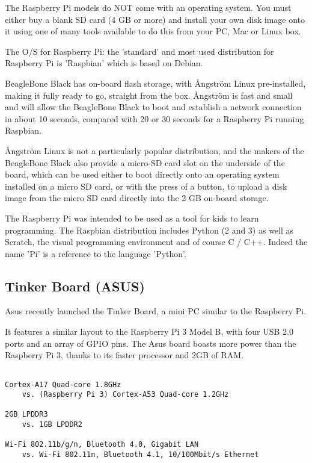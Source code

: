 The Raspberry Pi models do NOT come with an operating system. You must either
buy a blank SD card (4 GB or more) and install your own disk image onto it using
one of many tools available to do this from your PC, Mac or Linux box.

The O/S for Raspberry Pi: the 'standard' and most used distribution for
Raspberry Pi is 'Raspbian' which is based on Debian.

\begin{mdframed}

BeagleBone Black has on-board flash storage, with  Ångström Linux pre-installed,
making it fully ready to go, straight from the box.
Ångström is fast and small and will allow the BeagleBone Black to boot and
establish a network connection in about 10 seconds, compared with 20 or 30
seconds for a Raspberry Pi running Raspbian.


Ångström Linux is not a particularly popular distribution, and the makers of the
BeagleBone Black also provide a micro-SD card slot on the underside of the
board, which can be used either to boot directly onto an operating system
installed on a micro SD card, or with the press of a button, to upload a disk
image from the micro SD card directly into the 2 GB on-board storage.
\end{mdframed}


The Raspberry Pi was intended to be used as a tool for kids to learn
programming. The Raspbian distribution includes Python (2 and 3) as well as
Scratch, the visual programming environment and of course C / C++. Indeed the name 'Pi' is a reference to the language 'Python'. 


\subsection{Tinker Board (ASUS)}
\label{sec:TinkerBoard-Asus}

Asus recently launched the Tinker Board, a mini PC similar to the Raspberry Pi.

It features a similar layout to the Raspberry Pi 3 Model B, with four USB 2.0
ports and an array of GPIO pins. The Asus board boasts more power than the
Raspberry Pi 3, thanks to its faster processor and 2GB of RAM.
\begin{verbatim}

Cortex-A17 Quad-core 1.8GHz	
 	vs. (Raspberry Pi 3) Cortex-A53 Quad-core 1.2GHz

2GB LPDDR3	
	vs. 1GB LPDDR2
	
Wi-Fi 802.11b/g/n, Bluetooth 4.0, Gigabit LAN
	vs. Wi-Fi 802.11n, Bluetooth 4.1, 10/100Mbit/s Ethernet
\end{verbatim}


